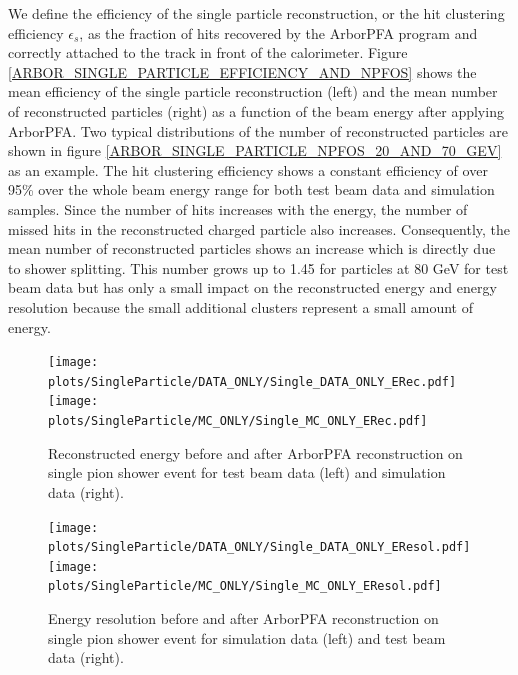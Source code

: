 \documentclass[cits]{JINST}
\begin{document}
We define the efficiency of the single particle reconstruction, or the hit clustering efficiency $\epsilon_s$, as the fraction of hits recovered by the ArborPFA program and correctly attached to the track in front of the calorimeter. Figure \ref{ARBOR_SINGLE_PARTICLE_EFFICIENCY_AND_NPFOS} shows the mean efficiency of the single particle reconstruction (left) and the mean number of reconstructed particles (right) as a function of the beam energy after applying ArborPFA. Two typical distributions of the number of reconstructed particles are shown in figure \ref{ARBOR_SINGLE_PARTICLE_NPFOS_20_AND_70_GEV} as an example. The hit clustering efficiency shows a constant efficiency of over 95\% over the whole beam energy range for both test beam data and simulation samples. Since the number of hits increases with the energy, the number of missed hits in the reconstructed charged particle also increases. Consequently, the mean number of reconstructed particles shows an increase which is directly due to shower splitting. This number grows up to 1.45 for particles at 80 GeV for test beam data but has only a small impact on the reconstructed energy and energy resolution because the small additional clusters represent a small amount of energy.

\begin{figure}[!h]
  \begin{center}
    \texttt{[image: plots/SingleParticle/DATA\_ONLY/Single\_DATA\_ONLY\_ERec.pdf]}
    \texttt{[image: plots/SingleParticle/MC\_ONLY/Single\_MC\_ONLY\_ERec.pdf]} \\
  \end{center}
  \caption{\label{ARBOR_SINGLE_PARTICLE_EREC_DATA_MC} Reconstructed energy before and after ArborPFA reconstruction on single pion shower event for test beam data (left) and simulation data (right).}
\end{figure}

\begin{figure}[!h]
  \begin{center}
    \texttt{[image: plots/SingleParticle/DATA\_ONLY/Single\_DATA\_ONLY\_EResol.pdf]}
    \texttt{[image: plots/SingleParticle/MC\_ONLY/Single\_MC\_ONLY\_EResol.pdf]} \\
  \end{center}
  \caption{\label{ARBOR_SINGLE_PARTICLE_ERESOL_DATA_MC} Energy resolution before and after ArborPFA reconstruction on single pion shower event for simulation data (left) and test beam data (right).}
\end{figure}
\end{document}
